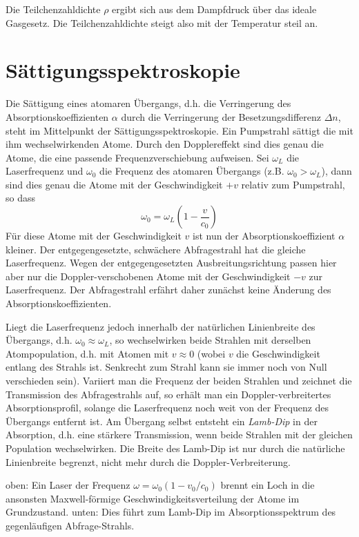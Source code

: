 Die Teilchenzahldichte $\rho$ ergibt sich aus dem Dampfdruck über das ideale Gasgesetz. Die Teilchenzahldichte steigt also mit der Temperatur steil an.


\section{Sättigungsspektroskopie}

Die Sättigung eines atomaren Übergangs, d.h. die Verringerung des Absorptionskoeffizienten $\alpha$ durch die Verringerung der Besetzungsdifferenz $\Delta n$, steht im Mittelpunkt der Sättigungsspektroskopie.  Ein Pumpstrahl sättigt die mit ihm wechselwirkenden Atome. Durch den Dopplereffekt sind dies genau die Atome, die eine passende Frequenzverschiebung aufweisen. Sei $\omega_L$ die Laserfrequenz und $\omega_0$ die Frequenz des atomaren Übergangs (z.B. $\omega_0 > \omega_L$), dann sind dies genau die Atome mit der Geschwindigkeit $+v$ relativ zum Pumpstrahl, so dass
\begin{equation}
	\omega_0 = \omega_L \left( 1 - \frac{v}{c_0} \right)
\end{equation}
Für diese Atome mit der Geschwindigkeit $v$ ist nun der Absorptionskoeffizient $\alpha$ kleiner. Der entgegengesetzte, schwächere Abfragestrahl hat die gleiche Laserfrequenz. Wegen der entgegengesetzten Ausbreitungsrichtung passen hier aber nur die Doppler-verschobenen Atome mit der Geschwindigkeit $-v$ zur Laserfrequenz. Der Abfragestrahl erfährt daher zunächst keine Änderung des Absorptionskoeffizienten.

Liegt die Laserfrequenz jedoch innerhalb der natürlichen Linienbreite des Übergangs, d.h. $\omega_0 \approx \omega_L$, so wechselwirken beide Strahlen mit derselben Atompopulation, d.h. mit Atomen mit $v \approx 0$ (wobei $v$ die Geschwindigkeit entlang des Strahls ist. Senkrecht zum Strahl kann sie immer noch von Null verschieden sein). Variiert man die Frequenz der beiden Strahlen und zeichnet die Transmission des Abfragestrahls auf, so erhält man ein Doppler-verbreitertes Absorptionsprofil, solange die Laserfrequenz noch weit von der Frequenz des Übergangs entfernt ist. Am Übergang selbst entsteht ein \emph{Lamb-Dip} in der Absorption, d.h. eine stärkere Transmission, wenn beide Strahlen mit der gleichen Population wechselwirken. Die Breite des Lamb-Dip ist nur durch die natürliche Linienbreite begrenzt, nicht mehr durch die Doppler-Verbreiterung.

\begin{marginfigure}
	\caption{oben: Ein Laser der Frequenz $\omega = \omega_0 (1 - v_0/c_0)$ brennt ein Loch in die ansonsten Maxwell-förmige Geschwindigkeitsverteilung der Atome im Grundzustand. unten: Dies führt zum Lamb-Dip im Absorptionsspektrum des gegenläufigen Abfrage-Strahls.}
\end{marginfigure}


